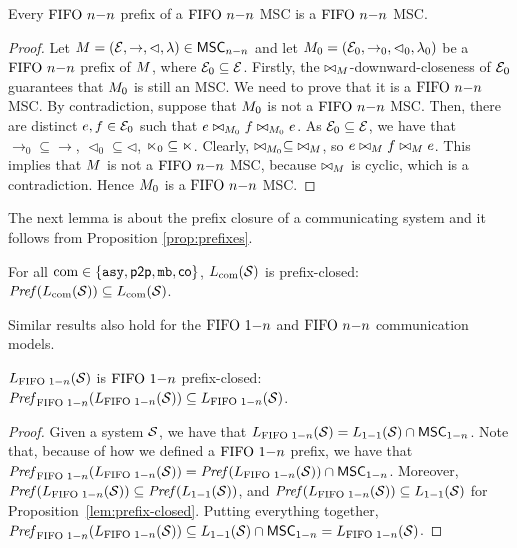 \begin{proposition}
	\label{prop:prefixes-nn}
	Every $\text{FIFO } n\mathsf{-}n$ prefix of a $\text{FIFO } n\mathsf{-}n$ MSC is a $\text{FIFO } n\mathsf{-}n$ MSC.
\end{proposition}
\begin{proof}
	Let $M = (\mathcal{E}, \to, \lhd, \lambda) \in \mathsf{MSC}_{n\mathsf{-}n}$ and let $M_0 =
	(\mathcal{E}_0, \to_0, \lhd_0, \lambda_0)$ be a $\text{FIFO } n\mathsf{-}n$ prefix of $M$, where $\mathcal{E}_0 \subseteq \mathcal{E}$. Firstly, the $\bowtie_M$-downward-closeness of $\mathcal{E}_0$ guarantees that ${M_0}$ is still an MSC. We need to prove that it is a $\text{FIFO } n\mathsf{-}n$ MSC. By contradiction, suppose that $M_0$ is not a $\text{FIFO } n\mathsf{-}n$ MSC. Then, there are distinct $e,f \in \mathcal{E}_0$ such that $e \bowtie_{M_0} f \bowtie_{M_0} e$. As $\mathcal{E}_0 \subseteq \mathcal{E}$, we have that ${\rightarrow_0} \subseteq {\rightarrow}$, ${\lhd_0} \subseteq {\lhd}$, ${\ltimes_0} \subseteq {\ltimes}$. Clearly, $\bowtie_{M_0} \subseteq\; \bowtie_M$, so $e \bowtie_M f \bowtie_M e$. This implies that $M$ is not a $\text{FIFO } n\mathsf{-}n$ MSC, because $\bowtie_M$ is cyclic, which is a contradiction. Hence $M_0$ is a $\text{FIFO } n\mathsf{-}n$ MSC.
\end{proof}

The next lemma is about the prefix closure of a communicating system and it follows from Proposition \ref{prop:prefixes}.

\begin{proposition}\label{lem:co-prefix-closed}
	For all $\textup{com} \in \{\mathtt{asy}, \mathsf{p2p}, \mathtt{mb}, \mathsf{co}\}$, $L_{\textup{com}}(\mathcal{S})$ is prefix-closed:
	$\mathit{Pref}(L_{\textup{com}}(\mathcal{S})) \subseteq L_{\textup{com}}(\mathcal{S})$.
\end{proposition}

Similar results also hold for the $\text{FIFO } 1\mathsf{-}n$ and $\text{FIFO } n\mathsf{-}n$ communication models.

\begin{proposition}\label{lem:onen-prefix-closed}
	$L_{\text{FIFO } 1\mathsf{-}n}(\mathcal{S})$ is $\text{FIFO } 1\mathsf{-}n$ prefix-closed:
	$\mathit{Pref}_{\text{FIFO } 1\mathsf{-}n}(L_{\text{FIFO } 1\mathsf{-}n}(\mathcal{S})) \subseteq L_{\text{FIFO } 1\mathsf{-}n}(\mathcal{S})$.
\end{proposition}
\begin{proof}
	Given a system $\mathcal{S}$, we have that $L_{\text{FIFO } 1\mathsf{-}n}(\mathcal{S}) = L_{1\mathsf{-}1}(\mathcal{S}) \cap \mathsf{MSC}_{1\mathsf{-}n}$. Note that, because of how we defined a $\text{FIFO } 1\mathsf{-}n$ prefix, we have that $\mathit{Pref}_{\text{FIFO } 1\mathsf{-}n}(L_{\text{FIFO } 1\mathsf{-}n}(\mathcal{S})) = \mathit{Pref}(L_{\text{FIFO } 1\mathsf{-}n}(\mathcal{S})) \cap \mathsf{MSC}_{1\mathsf{-}n}$. Moreover, $\mathit{Pref}(L_{\text{FIFO } 1\mathsf{-}n}(\mathcal{S})) \subseteq \mathit{Pref}(L_{1\mathsf{-}1}(\mathcal{S}))$, and $\mathit{Pref}(L_{\text{FIFO } 1\mathsf{-}n}(\mathcal{S})) \subseteq L_{1\mathsf{-}1}(\mathcal{S})$ for Proposition~\ref{lem:prefix-closed}. Putting everything together, $\mathit{Pref}_{\text{FIFO } 1\mathsf{-}n}(L_{\text{FIFO } 1\mathsf{-}n}(\mathcal{S})) \subseteq L_{1\mathsf{-}1}(\mathcal{S}) \cap \mathsf{MSC}_{1\mathsf{-}n} = L_{\text{FIFO } 1\mathsf{-}n}(\mathcal{S})$.
\end{proof}

